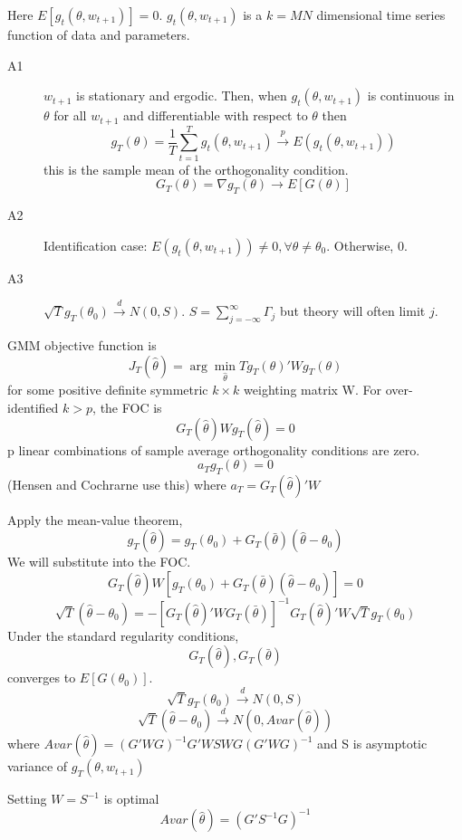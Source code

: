 \documentclass[11pt, a4paper, oneside]{article}
\theoremstyle{definition}
\theoremstyle{proposition}
\theoremstyle{corollary}
\theoremstyle{lemma}
\theoremstyle{theorem}
\begin{document}
Here $E[g_t(\theta, w_{t+1})] = 0$. $g_t(\theta, w_{t+ 1})$ is a $k =MN$ dimensional time series function of data and parameters. 
\begin{description}
\item[A1] $w_{t+1}$ is stationary and ergodic. Then, when $g_t(\theta, w_{t+1})$ is continuous in $\theta$ for all $w_{t+1}$ and differentiable with respect to $\theta$ then $$g_T(\theta) = \frac{1}{T}\sum_{t=1}^Tg_t(\theta, w_{t+1}) \overset{p}{\to} E(g_t(\theta, w_{t+1}))$$ 
this is the sample mean of the orthogonality condition. $$G_T(\theta) = \nabla g_T(\theta) \to E[G(\theta)]$$ 
\item[A2] Identification case: $E(g_t(\theta, w_{t+1})) \neq 0, \forall \theta \neq \theta_0$. Otherwise, 0. 
\item[A3] $\sqrt{T}g_T(\theta_0)\overset{d}{\to} N(0, S)$. $S = \sum_{j = -\infty}^{\infty}\Gamma_j$ but theory will often limit $j$. 
\end{description}

GMM objective function is $$J_T(\hat{\theta}) = \arg\min_{\hat{\theta}} Tg_T(\theta)'W g_T(\theta)$$ for some positive definite symmetric $k \times k$ weighting matrix W. For over-identified $k > p$, the FOC is 
$$G_T(\hat{\theta})W g_T(\hat{\theta}) = 0$$
p linear combinations of sample average orthogonality conditions are zero. 
$$a_Tg_T(\theta) = 0$$ (Hensen and Cochrarne use this)
where $a_T = G_T(\hat{\theta})'W$ 

Apply the mean-value theorem, $$g_T(\hat{\theta})=g_T(\theta_0)+ G_T(\bar{\theta})(\hat{\theta}- \theta_0)$$
We will substitute into the FOC. 
$$G_T(\hat{\theta})W[g_T(\theta_0) + G_T(\bar{\theta})(\hat{\theta}- \theta_0)] = 0$$
$$\sqrt{T}(\hat{\theta}- \theta_0) = -[G_T(\hat{\theta})'WG_T(\bar{\theta})]^{-1}G_T(\hat{\theta})'W\sqrt{T}g_T(\theta_0)$$
Under the standard regularity conditions, 
$$G_T(\hat{\theta}), G_T(\bar{\theta})$$ converges to $E[ G(\theta_0)]$. 
$$\sqrt{T}g_T(\theta_0) \overset{d}{\to} N(0, S)$$
$$\sqrt{T}(\hat{\theta} - \theta_0) \overset{d}{\to} N(0, Avar(\hat{\theta}))$$
where $Avar(\hat{\theta}) = (G'WG)^{-1}G'WSWG(G'WG)^{-1}$ and S is asymptotic variance of $g_T(\theta, w_{t+1})$

Setting $W = S^{-1}$ is optimal $$Avar(\hat{\theta}) = (G'S^{-1}G)^{-1}$$
\end{document}
